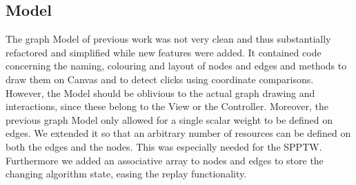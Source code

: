 \subsection{Model}
The graph Model of previous work was not very clean and thus substantially refactored and simplified while new features were added. It contained code concerning the naming, colouring and layout of nodes and edges and methods to draw them on Canvas and to detect clicks using coordinate comparisons. However, the Model should be oblivious to the actual graph drawing and interactions, since these belong to the View or the Controller. Moreover, the previous graph Model only allowed for a single scalar weight to be defined on edges. We extended it so that an arbitrary number of resources can be defined on both the edges and the nodes. This was especially needed for the SPPTW. Furthermore we added an associative array to nodes and edges to store the changing algorithm state, easing the replay functionality.

\renewcommand{\umldrawcolor}{black}
\renewcommand{\umlfillcolor}{lightyellow}

